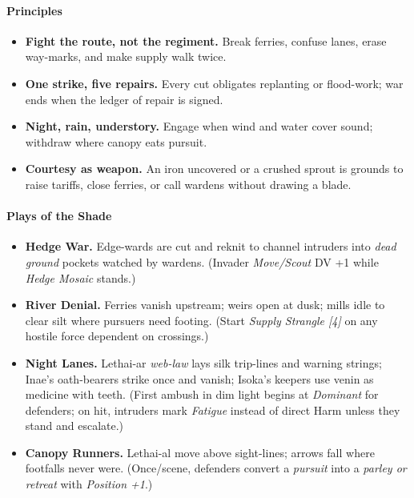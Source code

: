 \documentclass[11pt]{article}
\begin{document}
\paragraph{Principles}
\begin{itemize}[leftmargin=*]
  \item \textbf{Fight the route, not the regiment.} Break ferries, confuse lanes, erase way-marks, and make supply walk twice.
  \item \textbf{One strike, five repairs.} Every cut obligates replanting or flood-work; war ends when the ledger of repair is signed.
  \item \textbf{Night, rain, understory.} Engage when wind and water cover sound; withdraw where canopy eats pursuit.
  \item \textbf{Courtesy as weapon.} An iron uncovered or a crushed sprout is grounds to raise tariffs, close ferries, or call wardens without drawing a blade.
\end{itemize}

\paragraph{Plays of the Shade}
\begin{itemize}[leftmargin=*]
  \item \textbf{Hedge War.} Edge-wards are cut and reknit to channel intruders into \emph{dead ground} pockets watched by wardens. (Invader \emph{Move/Scout} DV +1 while \emph{Hedge Mosaic} stands.)
  \item \textbf{River Denial.} Ferries vanish upstream; weirs open at dusk; mills idle to clear silt where pursuers need footing. (Start \emph{Supply Strangle [4]} on any hostile force dependent on crossings.)
  \item \textbf{Night Lanes.} Lethai-ar \emph{web-law} lays silk trip-lines and warning strings; Inae's oath-bearers strike once and vanish; Isoka's keepers use venin as medicine with teeth. (First ambush in dim light begins at \emph{Dominant} for defenders; on hit, intruders mark \emph{Fatigue} instead of direct Harm unless they stand and escalate.)
  \item \textbf{Canopy Runners.} Lethai-al move above sight-lines; arrows fall where footfalls never were. (Once/scene, defenders convert a \emph{pursuit} into a \emph{parley or retreat} with \emph{Position +1}.)
\end{itemize}
\end{document}
